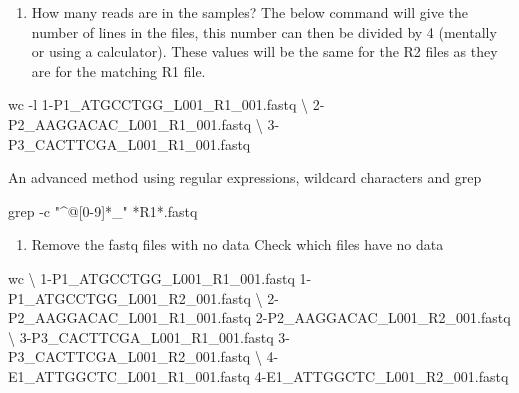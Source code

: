 \documentclass[
  letterpaper,
  DIV=11,
  numbers=noendperiod]{scrreprt}
\newenvironment{Shaded}{\begin{snugshade}}{\end{snugshade}}
\newcommand{\AttributeTok}[1]{\textcolor[rgb]{0.40,0.45,0.13}{#1}}
\newcommand{\DataTypeTok}[1]{\textcolor[rgb]{0.68,0.00,0.00}{#1}}
\newcommand{\FunctionTok}[1]{\textcolor[rgb]{0.28,0.35,0.67}{#1}}
\newcommand{\NormalTok}[1]{\textcolor[rgb]{0.00,0.23,0.31}{#1}}
\newcommand{\PreprocessorTok}[1]{\textcolor[rgb]{0.68,0.00,0.00}{#1}}
\newcommand{\StringTok}[1]{\textcolor[rgb]{0.13,0.47,0.30}{#1}}
\providecommand{\tightlist}{%
  \setlength{\itemsep}{0pt}\setlength{\parskip}{0pt}}
\begin{document}
\begin{enumerate}
\def\labelenumi{\arabic{enumi}.}
\setcounter{enumi}{3}
\tightlist
\item
  How many reads are in the samples? The below command will give the
  number of lines in the files, this number can then be divided by 4
  (mentally or using a calculator). These values will be the same for
  the R2 files as they are for the matching R1 file.
\end{enumerate}

\begin{Shaded}
\begin{Highlighting}[]
\FunctionTok{wc} \AttributeTok{{-}l}\NormalTok{ 1{-}P1\_ATGCCTGG\_L001\_R1\_001.fastq }\DataTypeTok{\textbackslash{}}
\NormalTok{2{-}P2\_AAGGACAC\_L001\_R1\_001.fastq }\DataTypeTok{\textbackslash{}}
\NormalTok{3{-}P3\_CACTTCGA\_L001\_R1\_001.fastq}
\end{Highlighting}
\end{Shaded}

An advanced method using regular expressions, wildcard characters and
grep

\begin{Shaded}
\begin{Highlighting}[]
\FunctionTok{grep} \AttributeTok{{-}c} \StringTok{"\^{}@[0{-}9]*\_"} \PreprocessorTok{*}\NormalTok{R1}\PreprocessorTok{*}\NormalTok{.fastq}
\end{Highlighting}
\end{Shaded}

\begin{enumerate}
\def\labelenumi{\arabic{enumi}.}
\setcounter{enumi}{4}
\tightlist
\item
  Remove the fastq files with no data Check which files have no data
\end{enumerate}

\begin{Shaded}
\begin{Highlighting}[]
\FunctionTok{wc} \DataTypeTok{\textbackslash{}}
\NormalTok{1{-}P1\_ATGCCTGG\_L001\_R1\_001.fastq 1{-}P1\_ATGCCTGG\_L001\_R2\_001.fastq }\DataTypeTok{\textbackslash{}}
\NormalTok{2{-}P2\_AAGGACAC\_L001\_R1\_001.fastq 2{-}P2\_AAGGACAC\_L001\_R2\_001.fastq }\DataTypeTok{\textbackslash{}}
\NormalTok{3{-}P3\_CACTTCGA\_L001\_R1\_001.fastq 3{-}P3\_CACTTCGA\_L001\_R2\_001.fastq }\DataTypeTok{\textbackslash{}}
\NormalTok{4{-}E1\_ATTGGCTC\_L001\_R1\_001.fastq 4{-}E1\_ATTGGCTC\_L001\_R2\_001.fastq }
\end{Highlighting}
\end{Shaded}
\end{document}
